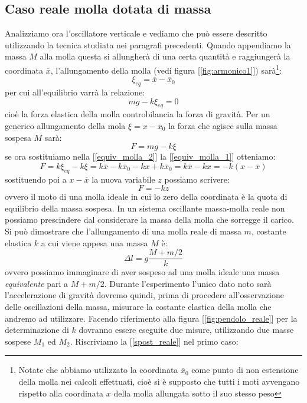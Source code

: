 \documentclass[a4paper,10pt,oneside]{article}
\begin{document}
\subsection*{Caso reale molla dotata di massa}
Analizziamo ora l'oscillatore verticale e vediamo che può essere descritto utilizzando la tecnica studiata nei paragrafi precedenti. Quando appendiamo la massa $M$ alla molla questa si allungherà di una certa quantità e raggiungerà la coordinata $\overline x$, l'allungamento della molla (vedi figura [\ref{fig:armonico1}]) sarà\footnote{Notate che abbiamo utilizzato la coordinata $\overline x_0$ come punto di non estensione della molla nei calcoli effettuati, cioè si è supposto che tutti i moti avvengano rispetto alla coordinata $x$ della molla allungata sotto il suo stesso peso}:
\begin{equation}
 \xi_{eq}=\overline x-\overline x_0
\end{equation}
per cui all'equilibrio varrà la relazione:
\begin{equation}\label{equiv_molla_1}
 mg-k\xi_{eq}=0
\end{equation}
cioè la forza elastica della molla controbilancia la forza di gravità. Per un generico allungamento della mola $\xi=x-\overline x_0$ la forza che agisce sulla massa sospesa $M$ sarà:
\begin{equation}\label{equiv_molla_2}
 F=mg-k\xi
\end{equation}
se ora sostituiamo nella [\ref{equiv_molla_2}] la [\ref{equiv_molla_1}] otteniamo:
\begin{equation}
 F=k\xi_{eq}-k\xi=k\overline x -k\overline x_0-kx+k\overline x_0=k\overline x-kx=-k(x-\overline x)
\end{equation}
sostituendo poi a $x-\overline x$ la nuova variabile $z$ possiamo scrivere:
\begin{equation}
 F=-kz
\end{equation}
ovvero il moto di una molla ideale in cui lo zero della coordinata è la quota di equilibrio della massa sospesa.
In un sistema oscillante massa-molla reale non possiamo prescindere dal considerare la massa della molla che sorregge il carico.
Si può dimostrare che l'allungamento di una molla reale di massa $m$, costante elastica $k$ a cui viene appesa una massa  $M$ è:
\begin{equation}\label{spost_reale}
 \Delta l=g\frac{M+m/2}{k}
\end{equation}
ovvero possiamo immaginare di aver sospeso ad una molla ideale una massa \emph{equivalente} pari a $M+
m/2$.
Durante l'esperimento l'unico dato noto sarà l'accelerazione di gravità dovremo quindi, prima di procedere all'osservazione delle oscillazioni della massa, misurare la costante elastica della molla che andremo ad utilizzare. Facendo riferimento alla figura [\ref{fig:pendolo_reale}] per la determinazione di $k$ dovranno essere eseguite due misure, utilizzando due masse sospese $M_1$ ed $M_2$. Riscriviamo la [\ref{spost_reale}] nel primo caso:
\end{document}
